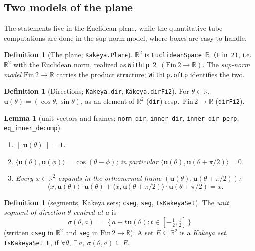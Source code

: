 \documentclass[11pt,a4paper]{article}
\newcommand{\R}{\mathbb{R}}
\newcommand{\Plane}{\ensuremath{\mathbb{R}^{2}}}     %
\newcommand{\FinTwo}{\ensuremath{\mathrm{Fin}\,2 \to \R}}
\newcommand{\dir}{\mathbf{u}}                        %
\newcommand{\tseg}{\sigma}                           %
\newcommand{\lname}[1]{\texttt{#1}}                  %
\newcommand{\lb}{\_\allowbreak}                      %
\newtheorem{lemma}[theorem]{Lemma}
\theoremstyle{definition}
\newtheorem{definition}[theorem]{Definition}
\theoremstyle{remark}
\begin{document}
\subsection{Two models of the plane}

The statements live in the Euclidean plane, while the quantitative tube computations are
done in the sup-norm model, where boxes are easy to handle.

\begin{definition}[{The plane; \lname{Kakeya.Plane}}] $\Plane$ is
\lname{EuclideanSpace}~$\R$~\lname{(Fin 2)}, i.e.\ $\R^2$ with the Euclidean norm,
realized as \lname{WithLp}~$2$~$(\FinTwo)$.  The \emph{sup-norm model} \FinTwo{} carries
the product
structure; \lname{WithLp.ofLp} identifies the two.
\end{definition}

\begin{definition}[{Directions; \lname{Kakeya.dir}, \lname{Kakeya.dirFi2}}]
For $\theta\in\R$, $\dir(\theta) = (\cos\theta,\sin\theta)$, as an element of $\Plane$
(\lname{dir}) resp.\ $\FinTwo$ (\lname{dirFi2}).
\end{definition}

\begin{lemma}[{unit vectors and frames; \lname{norm\_dir}, \lname{inner\_dir},
\lname{inner\lb dir\lb perp}, \lname{eq\lb inner\lb decomp}}]\  \label{lem:frame}
\begin{enumerate}
\item $\|\dir(\theta)\|=1$.
\item $\langle \dir(\theta),\dir(\phi)\rangle = \cos(\theta-\phi)$; in particular
$\langle \dir(\theta),\dir(\theta+\pi/2)\rangle=0$.
\item Every $x\in\Plane$ expands in the orthonormal frame
$(\dir(\theta),\dir(\theta+\pi/2))$:
\[
  \langle x,\dir(\theta)\rangle\cdot\dir(\theta)
  + \langle x,\dir(\theta+\pi/2)\rangle\cdot\dir(\theta+\pi/2) = x .
\]
\end{enumerate}
\end{lemma}

\begin{definition}[{segments, Kakeya sets; \lname{cseg}, \lname{seg}, \lname{IsKakeyaSet}}]
The \emph{unit segment of direction $\theta$ centred at $a$} is
\[
  \tseg(\theta,a) \;=\; \{\, a + t\,\dir(\theta) : t\in[-\tfrac12,\tfrac12] \,\}
\]
(written \lname{cseg} in $\Plane$ and \lname{seg} in $\FinTwo$).  A set
$E\subseteq\Plane$ is a \emph{Kakeya set},
\lname{IsKakeyaSet E}, if $\forall\theta,\ \exists\,a,\ \tseg(\theta,a)\subseteq E$.
\end{definition}
\end{document}
